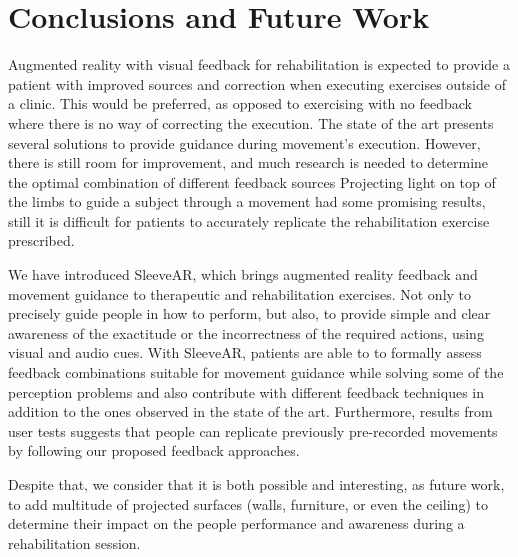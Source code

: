 \chapter{Conclusions and Future Work}
\label{sec:conclusions}


Augmented reality with visual feedback for rehabilitation is expected to provide a patient with improved sources and correction when executing exercises outside of a clinic. 
This would be preferred, as opposed to exercising with no feedback where there is no way of correcting the execution.
The state of the art presents several solutions to provide guidance during movement's execution.
However, there is still room for improvement, and much research is needed to determine the optimal combination of different feedback sources
Projecting light on top of the limbs to guide a subject through a movement had some promising results, still it is difficult for patients to accurately replicate the rehabilitation exercise prescribed.

We have introduced SleeveAR, which brings augmented reality feedback and movement guidance to therapeutic and rehabilitation exercises. Not only to precisely guide people in how to perform, but also, to provide simple and clear awareness of the exactitude or the incorrectness of the required actions, using visual and audio cues.
With SleeveAR, patients are able to to formally assess feedback combinations suitable for movement guidance while solving some of the perception problems and also contribute with different feedback techniques in addition to the ones observed in the state of the art.
Furthermore, results from user tests suggests that people can replicate previously pre-recorded movements by following our proposed feedback approaches.



Despite that, we consider that it is both possible and interesting, as future work, to add multitude of projected surfaces (walls, furniture, or even the ceiling)  to determine their impact on the people performance and awareness during a rehabilitation session.